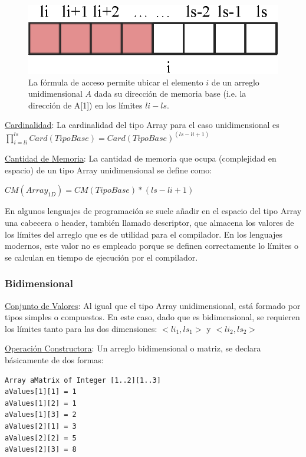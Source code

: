 \begin{figure}[!htb]
\centering
\includegraphics[scale=.7]{images/arreglo.eps}
\caption{La fórmula de acceso permite ubicar el elemento $i$ de un arreglo unidimensional $A$ dada su dirección de memoria base (i.e. la dirección de A[1]) en los límites $li-ls$.}
\label{fig:array}
\end{figure}

\underline{Cardinalidad}: La cardinalidad del tipo Array para el caso unidimensional es $\prod_{i=li}^{ls}{Card(TipoBase)} = Card(TipoBase)^{(ls-li+1)}$

\underline{Cantidad de Memoria}: La cantidad de memoria que ocupa (complejidad en espacio) de un tipo Array unidimensional se define como:

$CM(Array_{1D}) = CM(TipoBase) * (ls - li + 1)$

En algunos lenguajes de programación se suele añadir en el espacio del tipo Array una cabecera o header, también llamado descriptor, que almacena los valores de los límites del arreglo que es de utilidad para el compilador. En los lenguajes modernos, este valor no es empleado porque se definen correctamente lo límites o se calculan en tiempo de ejecución por el compilador.

\subsubsection{Bidimensional}

\underline{Conjunto de Valores}: Al igual que el tipo Array unidimensional, está formado por tipos simples o compuestos. En este caso, dado que es bidimensional, se requieren los límites tanto para las dos dimensiones: $<li_1, ls_1>$ y $<li_2, ls_2>$

\underline{Operación Constructora}: Un arreglo bidimensional o matriz, se declara básicamente de dos formas:

\begin{lstlisting}[upquote=true, language=pseudo]
Array aMatrix of Integer [1..2][1..3]
aValues[1][1] = 1
aValues[1][2] = 1
aValues[1][3] = 2
aValues[2][1] = 3
aValues[2][2] = 5
aValues[2][3] = 8
\end{lstlisting}

